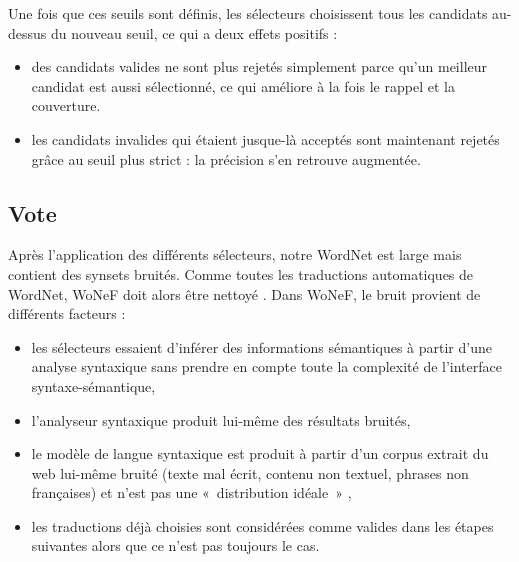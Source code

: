 Une fois que ces seuils sont définis, les sélecteurs choisissent tous les
candidats au-dessus du nouveau seuil, ce qui a deux effets positifs :

\begin{itemize}

    \item des candidats valides ne sont plus rejetés simplement parce qu'un
        meilleur candidat est aussi sélectionné, ce qui améliore à la fois le
        rappel et la couverture.

    \item les candidats invalides qui étaient jusque-là acceptés sont
        maintenant rejetés grâce au seuil plus strict : la précision s'en
        retrouve augmentée.

\end{itemize}

\subsection{Vote}
\label{subsec:voting}

Après l'application des différents sélecteurs, notre WordNet est large mais
contient des synsets bruités. Comme toutes les traductions automatiques de
WordNet, WoNeF doit alors être nettoyé \citep{sagot2012cleaning}. Dans WoNeF,
le bruit provient de différents facteurs :

\begin{itemize}

    \item les sélecteurs essaient d'inférer des informations sémantiques à
        partir d'une analyse syntaxique sans prendre en compte toute la
        complexité de l'interface syntaxe-sémantique,

    \item l'analyseur syntaxique produit lui-même des résultats bruités,

    \item le modèle de langue syntaxique est produit à partir d'un corpus
        extrait du web lui-même bruité (texte mal écrit, contenu non textuel,
        phrases non françaises) et n'est pas une «~distribution idéale~»
        \citep{copestake2013lexicalised},

    \item les traductions déjà choisies sont considérées comme valides dans les
        étapes suivantes alors que ce n'est pas toujours le cas.

\end{itemize}

